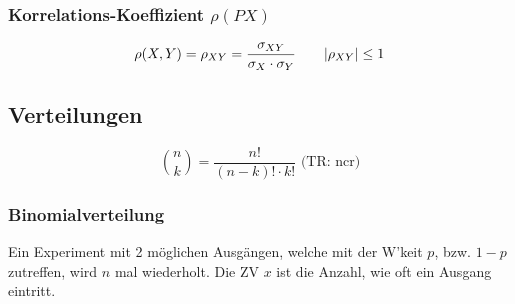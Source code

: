 \documentclass[a4paper]{article}
\begin{document}
\begin{twocolumn}
\subsubsection{Korrelations-Koeffizient $\rho(PX)$}
$$\rho(X,Y) = \rho_{XY} = \frac{\sigma_{XY}}{\sigma_{X} \cdot \sigma_Y} \qquad
\abs{\rho_{XY}} \leq 1$$

\subsection{Verteilungen}
$$\binom{n}{k} = \frac{n!}{(n-k)! \cdot k!} \text{ (TR: ncr)}$$
\subsubsection{Binomialverteilung}
Ein Experiment mit 2 möglichen Ausgängen, welche mit der W'keit $p$, bzw. $1-p$
zutreffen, wird $n$ mal wiederholt. Die ZV $x$ ist die Anzahl, wie oft ein Ausgang
eintritt. 

\vspace{1em}


\end{twocolumn}
\end{document}
